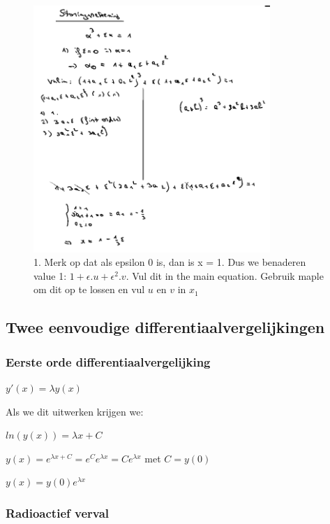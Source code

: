 \documentclass[a4paper]{report}
\begin{document}
\begin{figure}[H]
	\centering
	\includegraphics[width=0.8\textwidth]{assets/storing_solution.png}
	\caption{1. Merk op dat als epsilon 0 is, dan is x = 1. Dus we benaderen value 1: $1 + \epsilon . u + \epsilon^2 . v$. Vul dit in the main equation. Gebruik maple om dit op te lossen en vul $u$ en $v$ in $x_1$}
	\label{fig:storing_solution}
\end{figure}

\subsection{Twee eenvoudige differentiaalvergelijkingen}

\subsubsection{Eerste orde differentiaalvergelijking}

$y'(x) = \lambda y(x)$

Als we dit uitwerken krijgen we:

$ln(y(x)) = \lambda x + C$

$y(x) = e^{\lambda x + C} = e^C e^{\lambda x} = C e^{\lambda x}$ met $C = y(0)$

$y(x) = y(0) e^{\lambda x}$

\subsubsection*{Radioactief verval}
\end{document}

